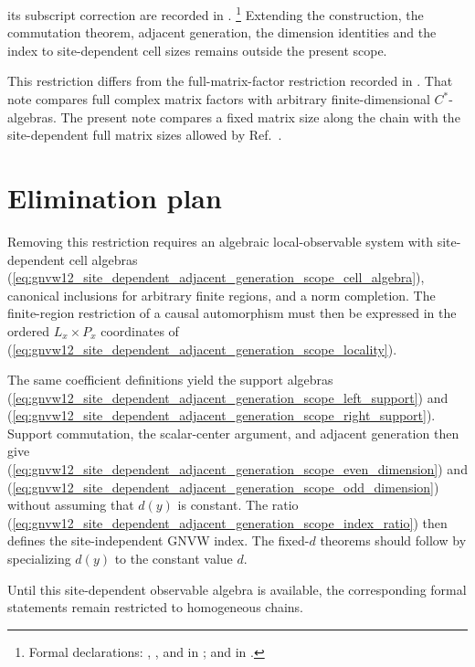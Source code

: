 \documentclass[11pt]{article}
\begin{document}
its subscript correction are recorded in
.%
\footnote{Formal declarations:
    ,
    ,
     and
    in ;
     and
    in .}
Extending the construction, the commutation theorem, adjacent generation,
the dimension identities and the index to site-dependent cell sizes remains
outside the present scope.

This restriction differs from the full-matrix-factor restriction recorded in
. That note
compares full complex matrix factors with arbitrary finite-dimensional
$C^*$-algebras. The present note compares a fixed matrix size along the chain
with the site-dependent full matrix sizes allowed by
Ref.~\cite{Gross2012IndexTheory}.

\section{Elimination plan}

Removing this restriction requires an algebraic local-observable system with
site-dependent cell algebras
(\ref{eq:gnvw12_site_dependent_adjacent_generation_scope_cell_algebra}),
canonical inclusions for arbitrary finite regions, and a norm completion. The
finite-region restriction of a causal automorphism must then be expressed in
the ordered $L_x\times P_x$ coordinates of
(\ref{eq:gnvw12_site_dependent_adjacent_generation_scope_locality}).

The same coefficient definitions yield the support algebras
(\ref{eq:gnvw12_site_dependent_adjacent_generation_scope_left_support}) and
(\ref{eq:gnvw12_site_dependent_adjacent_generation_scope_right_support}).
Support commutation, the scalar-center argument, and adjacent generation then
give
(\ref{eq:gnvw12_site_dependent_adjacent_generation_scope_even_dimension}) and
(\ref{eq:gnvw12_site_dependent_adjacent_generation_scope_odd_dimension})
without assuming that $d(y)$ is constant. The ratio
(\ref{eq:gnvw12_site_dependent_adjacent_generation_scope_index_ratio}) then
defines the site-independent GNVW index. The fixed-$d$ theorems should follow
by specializing $d(y)$ to the constant value $d$.

Until this site-dependent observable algebra is available, the corresponding
formal statements remain restricted to homogeneous chains.



\end{document}
